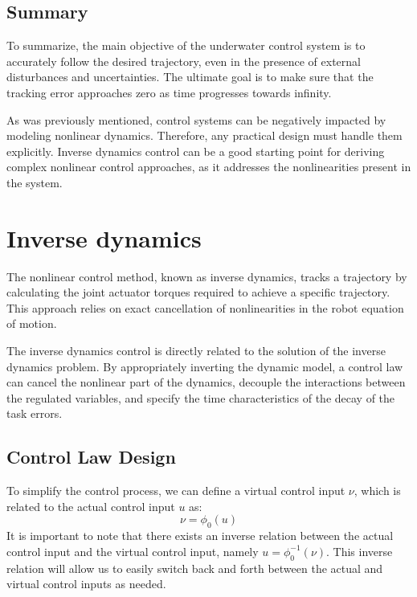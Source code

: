 \subsection{Summary}
    To summarize, the main objective of the underwater control system is to accurately 
    follow the desired trajectory, even in the presence of external disturbances 
    and uncertainties. The ultimate goal is to make sure that the tracking error 
    approaches zero as time progresses towards infinity.

    As was previously mentioned, control systems can be negatively impacted 
    by modeling nonlinear dynamics. Therefore, any practical design must handle them explicitly. 
    Inverse dynamics control can be a good starting point for deriving complex nonlinear 
    control approaches, as it addresses the nonlinearities present in the system.

\section{Inverse dynamics}

    The nonlinear control method, known as inverse dynamics, tracks a trajectory by calculating 
    the joint actuator torques required to achieve a specific trajectory.
    This approach relies on exact cancellation of nonlinearities in the robot equation of motion.

    The inverse dynamics control is directly related to the solution of the inverse
    dynamics problem. By appropriately inverting the dynamic model, a control law can 
    cancel the nonlinear part of the dynamics, decouple the interactions 
    between the regulated variables, and specify the time characteristics of the decay of the 
    task errors.

    \subsection{Control Law Design}
    To simplify the control process, we can define a virtual control 
    input $\nu$, which is related to the actual control input $u$ 
    as:
    \begin{equation}
        \nu = \phi_0(u)
    \end{equation} 
    It is important to note that there exists an inverse relation between 
    the actual control input and the virtual control input, namely 
    $u = \phi_0^{-1}(\nu)$. 
    This inverse relation will allow us to easily switch back and forth 
    between the actual and virtual control inputs as needed.

